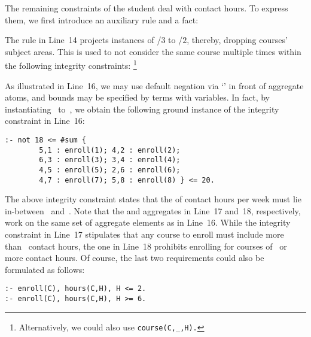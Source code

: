 \begin{example}
The remaining constraints of the student deal with contact hours.
To express them, we first introduce an auxiliary rule and a fact:
%

%
The rule in Line~14 projects instances of /$3$ to
/$2$, thereby, dropping courses' subject areas.
This is used to not consider the same course multiple times within the following
integrity constraints:%
\footnote{Alternatively, we could also use \lstinline{course(C,_,H).}}
%

%
As illustrated in Line~16,
we may use default negation via `' in front of aggregate atoms,
and bounds may be specified by terms with variables.
In fact, by instantiating~ to~,
we obtain the following ground instance of the integrity constraint in Line~16:
%
\begin{lstlisting}[firstnumber=16,stepnumber=16]
:- not 18 <= #sum {
        5,1 : enroll(1); 4,2 : enroll(2);
        6,3 : enroll(3); 3,4 : enroll(4);
        4,5 : enroll(5); 2,6 : enroll(6);
        4,7 : enroll(7); 5,8 : enroll(8) } <= 20.
\end{lstlisting}
%
The above integrity constraint states that the  of contact hours per week
must lie in-between~ and~.
Note that the  and  aggregates in Line~17 and~18, respectively,
work on the same set of aggregate elements as in Line~16.
While the integrity constraint in Line~17 stipulates that any course to enroll
must include more than~ contact hours,
the one in Line~18 prohibits enrolling for courses of~ or more contact hours.
Of course, the last two requirements could also be formulated as follows:
%
\begin{lstlisting}[firstnumber=17]
:- enroll(C), hours(C,H), H <= 2.
:- enroll(C), hours(C,H), H >= 6.
\end{lstlisting}


\end{example}
